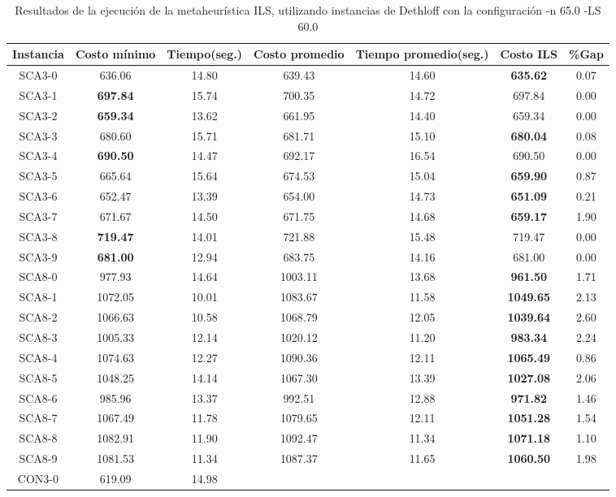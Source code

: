 \begin{table}[ht]
\caption{Resultados de la ejecución de la metaheurística ILS, utilizando instancias de Dethloff con la configuración -n 65.0 -LS 60.0}
\centering
\small
\begin{tabular}{c c c c c c c}
\hline\hline
Instancia & Costo mínimo & Tiempo(seg.) & Costo promedio & Tiempo promedio(seg.) & Costo ILS & \%Gap \\ [0.5ex]
\hline
SCA3-0 & 636.06 & 14.80 & 
639.43 & 14.60 & \bf{635.62} & 
0.07\\SCA3-1 & \bf{697.84} & 15.74 & 
700.35 & 14.72 & 697.84 & 0.00\\
SCA3-2 & \bf{659.34} & 13.62 & 
661.95 & 14.40 & 659.34 & 0.00\\
SCA3-3 & 680.60 & 15.71 & 
681.71 & 15.10 & \bf{680.04} & 
0.08\\SCA3-4 & \bf{690.50} & 14.47 & 
692.17 & 16.54 & 690.50 & 0.00\\
SCA3-5 & 665.64 & 15.64 & 
674.53 & 15.04 & \bf{659.90} & 
0.87\\SCA3-6 & 652.47 & 13.39 & 
654.00 & 14.73 & \bf{651.09} & 
0.21\\SCA3-7 & 671.67 & 14.50 & 
671.75 & 14.68 & \bf{659.17} & 
1.90\\SCA3-8 & \bf{719.47} & 14.01 & 
721.88 & 15.48 & 719.47 & 0.00\\
SCA3-9 & \bf{681.00} & 12.94 & 
683.75 & 14.16 & 681.00 & 0.00\\
SCA8-0 & 977.93 & 14.64 & 
1003.11 & 13.68 & \bf{961.50} & 
1.71\\SCA8-1 & 1072.05 & 10.01 & 
1083.67 & 11.58 & \bf{1049.65} & 
2.13\\SCA8-2 & 1066.63 & 10.58 & 
1068.79 & 12.05 & \bf{1039.64} & 
2.60\\SCA8-3 & 1005.33 & 12.14 & 
1020.12 & 11.20 & \bf{983.34} & 
2.24\\SCA8-4 & 1074.63 & 12.27 & 
1090.36 & 12.11 & \bf{1065.49} & 
0.86\\SCA8-5 & 1048.25 & 14.14 & 
1067.30 & 13.39 & \bf{1027.08} & 
2.06\\SCA8-6 & 985.96 & 13.37 & 
992.51 & 12.88 & \bf{971.82} & 
1.46\\SCA8-7 & 1067.49 & 11.78 & 
1079.65 & 12.11 & \bf{1051.28} & 
1.54\\SCA8-8 & 1082.91 & 11.90 & 
1092.47 & 11.34 & \bf{1071.18} & 
1.10\\SCA8-9 & 1081.53 & 11.34 & 
1087.37 & 11.65 & \bf{1060.50} & 
1.98\\CON3-0 & 619.09 & 14.98 & 

\end{tabular}
\end{table}
